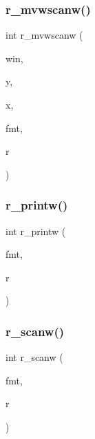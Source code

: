 \mbox{\label{C-macros_8c_a7db28527589679384ae2e79c665eddb4}} 
\subsubsection{\texorpdfstring{r\+\_\+mvwscanw()}{r\_mvwscanw()}}
{\footnotesize\ttfamily int r\+\_\+mvwscanw (\begin{DoxyParamCaption}\item[{W\+I\+N\+D\+OW $\ast$}]{win,  }\item[{int}]{y,  }\item[{int}]{x,  }\item[{char $\ast$}]{fmt,  }\item[{float $\ast$}]{r }\end{DoxyParamCaption})}

\mbox{\label{C-macros_8c_af5706198a4ac8d519c30824899cd04eb}} 
\subsubsection{\texorpdfstring{r\+\_\+printw()}{r\_printw()}}
{\footnotesize\ttfamily int r\+\_\+printw (\begin{DoxyParamCaption}\item[{const char $\ast$}]{fmt,  }\item[{float}]{r }\end{DoxyParamCaption})}

\mbox{\label{C-macros_8c_ae894ccf3428f2f98a5a10a654b34180a}} 
\subsubsection{\texorpdfstring{r\+\_\+scanw()}{r\_scanw()}}
{\footnotesize\ttfamily int r\+\_\+scanw (\begin{DoxyParamCaption}\item[{char $\ast$}]{fmt,  }\item[{float $\ast$}]{r }\end{DoxyParamCaption})}

